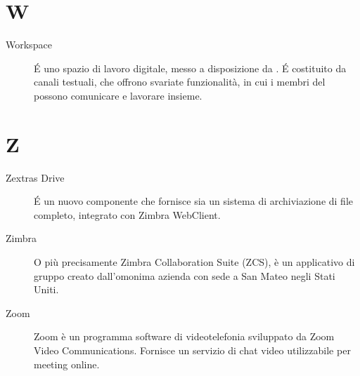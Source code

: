 \documentclass[a4paper, oneside]{article}
\begin{document}
\section{W}
\begin{description}
  \item[Workspace] É uno spazio di lavoro digitale, messo a disposizione da . É costituito da canali testuali, che offrono svariate funzionalità, in cui i membri del  possono comunicare e lavorare insieme.
\end{description}
\newpage
\section{Z}
\begin{description}
  \item[Zextras Drive] É un nuovo componente  che fornisce sia un sistema di archiviazione di file completo, integrato con Zimbra WebClient.
  \item[Zimbra] O più precisamente Zimbra Collaboration Suite (ZCS), è un  applicativo di gruppo creato dall'omonima azienda con sede a San Mateo negli Stati Uniti.
  \item[Zoom] Zoom è un programma software di videotelefonia sviluppato da Zoom Video Communications. Fornisce un servizio di chat video utilizzabile per meeting online.
\end{description}
\newpage
\end{document}
